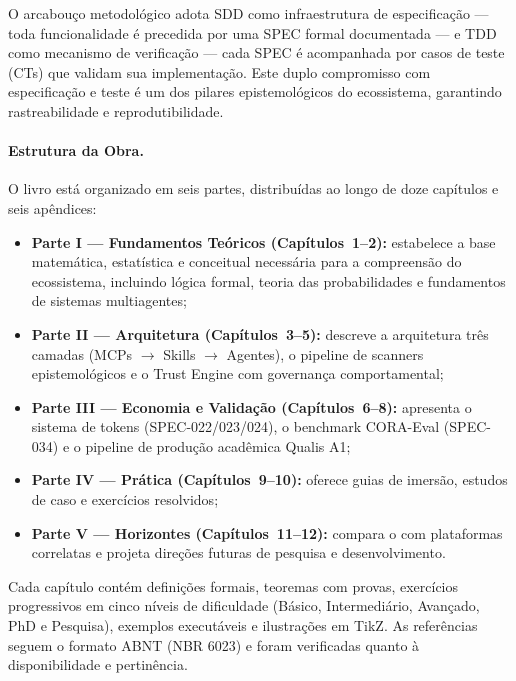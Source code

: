 O arcabouço metodológico adota SDD como infraestrutura de
especificação --- toda funcionalidade é precedida por uma SPEC formal
documentada --- e TDD como mecanismo de verificação --- cada SPEC é
acompanhada por casos de teste (CTs) que validam sua implementação.
Este duplo compromisso com especificação e teste é um dos pilares
epistemológicos do ecossistema, garantindo rastreabilidade e
reprodutibilidade.

\paragraph*{Estrutura da Obra.}
O livro está organizado em seis partes, distribuídas ao longo de doze
capítulos e seis apêndices:

\begin{itemize}
  \item \textbf{Parte I --- Fundamentos Teóricos (Capítulos~1--2):}
        estabelece a base matemática, estatística e conceitual necessária
        para a compreensão do ecossistema, incluindo lógica formal,
        teoria das probabilidades e fundamentos de sistemas multiagentes;
  \item \textbf{Parte II --- Arquitetura (Capítulos~3--5):}
        descreve a arquitetura três camadas (MCPs $\rightarrow$ Skills
        $\rightarrow$ Agentes), o pipeline de scanners epistemológicos
        e o Trust Engine com governança comportamental;
  \item \textbf{Parte III --- Economia e Validação (Capítulos~6--8):}
        apresenta o sistema de tokens (SPEC-022/023/024), o benchmark
        CORA-Eval (SPEC-034) e o pipeline de produção acadêmica Qualis A1;
  \item \textbf{Parte IV --- Prática (Capítulos~9--10):}
        oferece guias de imersão, estudos de caso e exercícios resolvidos;
  \item \textbf{Parte V --- Horizontes (Capítulos~11--12):}
        compara o \opencodeeco{} com plataformas correlatas e projeta
        direções futuras de pesquisa e desenvolvimento.
\end{itemize}

Cada capítulo contém definições formais, teoremas com provas,
exercícios progressivos em cinco níveis de dificuldade (Básico,
Intermediário, Avançado, PhD e Pesquisa), exemplos executáveis e
ilustrações em TikZ. As referências seguem o formato ABNT (NBR 6023)
e foram verificadas quanto à disponibilidade e pertinência.

